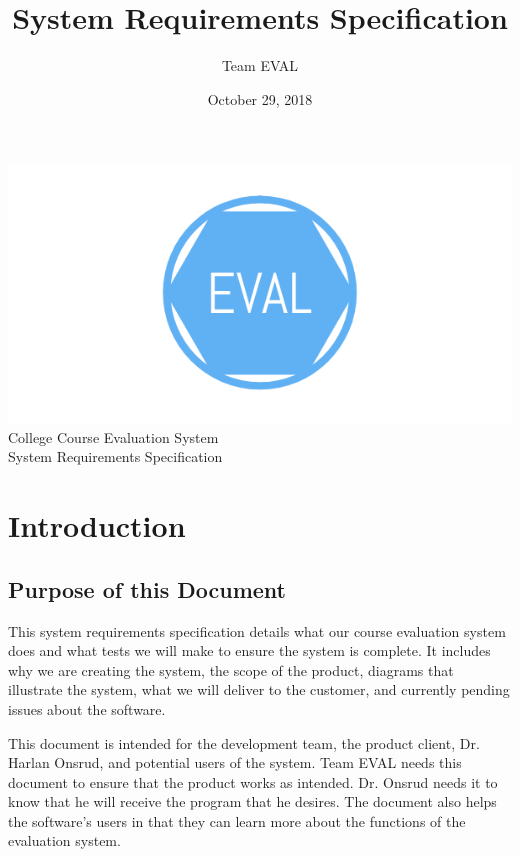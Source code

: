 \documentclass{article}
\title{System Requirements Specification}
\author{Team EVAL}
\date{October 29, 2018}
\begin{document}
\maketitle

\newpage

\begin{center}
{\includegraphics[scale=.3]{team_logo.png}}\\ \bigskip
{\LARGE College Course Evaluation System }\\ \medskip
{\large System Requirements Specification }\\ \medskip
\end{center}

\tableofcontents

\newpage

\section{Introduction}
\subsection{Purpose of this Document}

This system requirements specification details what our course evaluation system does and what tests we will make to ensure the system is complete. It includes why we are creating the system, the scope of the product, diagrams that illustrate the system, what we will deliver to the customer, and currently pending issues about the software.

This document is intended for the development team, the product client, Dr. Harlan Onsrud, and potential users of the system. Team EVAL needs this document to ensure that the product works as intended. Dr. Onsrud needs it to know that he will receive the program that he desires. The document also helps the software's users in that they can learn more about the functions of the evaluation system.
\end{document}
